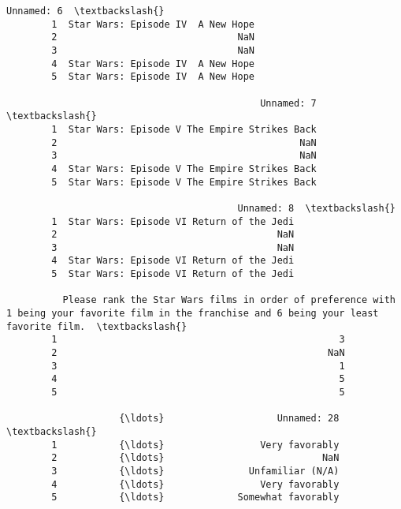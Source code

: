 \documentclass[11pt]{article}
\begin{document}
\begin{Verbatim}[commandchars=\\\{\}]
                                  Unnamed: 6  \textbackslash{}
        1  Star Wars: Episode IV  A New Hope   
        2                                NaN   
        3                                NaN   
        4  Star Wars: Episode IV  A New Hope   
        5  Star Wars: Episode IV  A New Hope   
        
                                             Unnamed: 7  \textbackslash{}
        1  Star Wars: Episode V The Empire Strikes Back   
        2                                           NaN   
        3                                           NaN   
        4  Star Wars: Episode V The Empire Strikes Back   
        5  Star Wars: Episode V The Empire Strikes Back   
        
                                         Unnamed: 8  \textbackslash{}
        1  Star Wars: Episode VI Return of the Jedi   
        2                                       NaN   
        3                                       NaN   
        4  Star Wars: Episode VI Return of the Jedi   
        5  Star Wars: Episode VI Return of the Jedi   
        
          Please rank the Star Wars films in order of preference with 1 being your favorite film in the franchise and 6 being your least favorite film.  \textbackslash{}
        1                                                  3                                                                                              
        2                                                NaN                                                                                              
        3                                                  1                                                                                              
        4                                                  5                                                                                              
        5                                                  5                                                                                              
        
                    {\ldots}                    Unnamed: 28  \textbackslash{}
        1           {\ldots}                 Very favorably   
        2           {\ldots}                            NaN   
        3           {\ldots}               Unfamiliar (N/A)   
        4           {\ldots}                 Very favorably   
        5           {\ldots}             Somewhat favorably   
        

\end{Verbatim}
\end{document}
